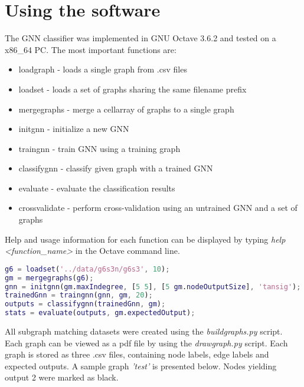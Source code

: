 
\chapter{Using the software\label{chapter:using}}
\noindent The GNN classifier was implemented in GNU Octave 3.6.2 and tested on a x86\_64 PC. The most important functions are:
\begin{itemize}
	\item loadgraph - loads a single graph from .csv files
	\item loadset - loads a set of graphs sharing the same filename prefix
	\item mergegraphs - merge a cellarray of graphs to a single graph
	\item initgnn - initialize a new GNN
	\item traingnn - train GNN using a training graph
	\item classifygnn - classify given graph with a trained GNN
	\item evaluate - evaluate the classification results
	\item crossvalidate - perform cross-validation using an untrained GNN and a set of graphs
\end{itemize}
\noindent Help and usage information for each function can be displayed by typing \emph{help <function\_name>} in the Octave command line.\\



\begin{lstlisting}[style=outcode, language=Matlab, caption=Sample usage session]
g6 = loadset('../data/g6s3n/g6s3', 10);
gm = mergegraphs(g6);
gnn = initgnn(gm.maxIndegree, [5 5], [5 gm.nodeOutputSize], 'tansig');
trainedGnn = traingnn(gnn, gm, 20);
outputs = classifygnn(trainedGnn, gm);
stats = evaluate(outputs, gm.expectedOutput);
\end{lstlisting}

\noindent All subgraph matching datasets were created using the \emph{buildgraphs.py} script. Each graph can be viewed as a pdf file by using the \emph{drawgraph.py} script. Each graph is stored as three .csv files, containing node labels, edge labels and expected outputs. A sample graph \emph{'test'} is presented below. Nodes yielding output 2 were marked as black.

\begin{figure}
\begin{floatrow}
\end{floatrow}
\end{figure}
